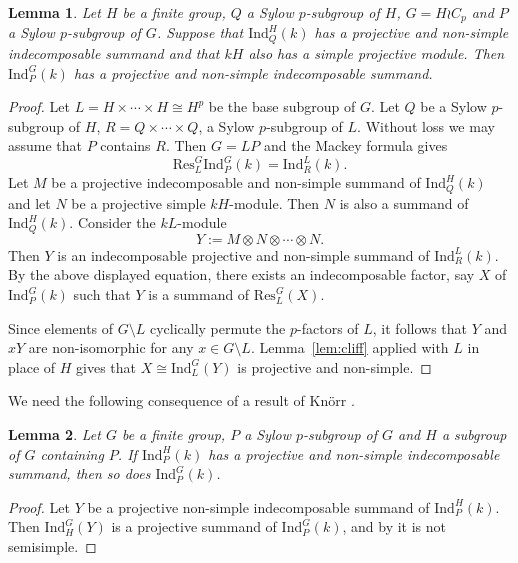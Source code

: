 \documentclass{amsart}
\theoremstyle{plain}\newtheorem{Theorem}{Theorem}[section]
\theoremstyle{plain}\newtheorem{Conjecture}[Theorem]{Conjecture}
\theoremstyle{plain}\newtheorem{Corollary}[Theorem]{Corollary}
\theoremstyle{plain}\newtheorem{Lemma}[Theorem]{Lemma}
\theoremstyle{plain}\newtheorem{Proposition}[Theorem]{Proposition}
\theoremstyle{definition}\newtheorem{Definition}[Theorem]{Definition}
\theoremstyle{definition}\newtheorem{Example}[Theorem]{Example}
\theoremstyle{definition}\newtheorem{Examples}[Theorem]{Examples}
\theoremstyle{definition}\newtheorem{Exercise}[Theorem]{Exercise}
\theoremstyle{definition}\newtheorem{Notation}[Theorem]{Notation}
\theoremstyle{definition}\newtheorem{Remark}[Theorem]{Remark}
\theoremstyle{definition}\newtheorem{Remarks}[Theorem]{Remarks}
\theoremstyle{plain}\newtheorem{Statement}[Theorem]{}
\def\Ind{\mathrm{Ind}}    \def\tenC{\otimes_C}
\def\Res{\mathrm{Res}}           \def\tenOR{\otimes_{\mathcal{O}R}}
\begin{document}
\begin{Lemma} \label{lem:wreath}   
Let $H$  be  a finite group, $Q$ a Sylow $p$-subgroup  of  $H$,  $G= H\wr C_p$ and 
$P$  a Sylow $p$-subgroup of $G$.  
Suppose  that  $\Ind_Q^H (k) $  has  a projective   and 
non-simple indecomposable  summand  and that   $kH$ also has a  simple projective 
module.  Then $\Ind_{P}^G(k) $     has  a  projective   and non-simple indecomposable 
summand.
\end{Lemma}

\begin{proof}  
Let $L = H \times \cdots\times H \cong H^p$ be the  base subgroup of $G$. Let  $Q$ 
be  a  Sylow $p$-subgroup  of $H$, $ R=  Q \times\cdots   \times  Q $,  a Sylow 
$p$-subgroup of $L$. Without loss  we may assume that  $ P$  contains  $R$.  
Then $ G =  LP$  and the Mackey formula gives
$$ \Res^G_L \Ind_P^G  (k)  = \Ind_R^L (k).$$
Let $M$ be  a  projective indecomposable  and non-simple summand  of     
$\Ind_{Q}^H(k) $ and let $N$ be a projective simple  $kH$-module. Then  
$N$ is  also a  summand of  $\Ind_{Q}^H(k) $.   Consider the $kL$-module
$$ Y :=  M  \otimes  N \otimes  \cdots \otimes N.   $$  Then  $ Y$ is an indecomposable 
projective and non-simple  summand of  $\Ind_R^L (k) $.   By  the above displayed 
equation, there exists an indecomposable factor, say $X$ of $ \Ind_P^G  (k) $ such 
that  $Y$ is a summand of $\Res^G_L (X) $.

Since    elements of $G\setminus L$ cyclically permute the   $p$-factors  of $L$, 
it follows that $Y $  and $xY$ are non-isomorphic  for any $x \in G\setminus L $.  
Lemma~\ref{lem:cliff}  applied with $L$ in place of $H$  gives that 
$X \cong \Ind_L^G (Y) $ is  projective  and non-simple.
\end{proof}  

We need the following consequence of a result of Kn\"orr 
\cite[2.13 Corollary]{Knoerr77}.

\begin{Lemma} \label{primetop}  
 Let $G$ be  a finite group, $P$ a Sylow $p$-subgroup of $G$ and $H$  a  subgroup 
 of $G$ containing $P$.   If  $\Ind_P^H(k)$  has  a projective  and non-simple  
 indecomposable  summand, then so does $\Ind_P^G (k) $.
\end{Lemma}

\begin{proof} 
Let $Y$ be a projective non-simple indecomposable summand of $\Ind^H_P(k)$.
Then $\Ind^G_H(Y)$ is a projective summand of $\Ind^G_P(k)$, and by
\cite[2.13 Corollary]{Knoerr77} it is not semisimple.
\end{proof} 
\end{document}
